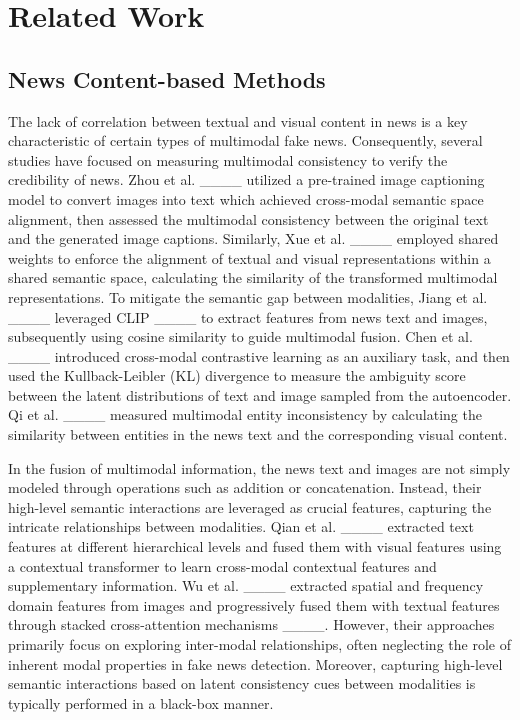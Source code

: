 \section{Related Work}

\subsection{News Content-based Methods}
The lack of correlation between textual and visual content in news is a key characteristic of certain types of multimodal fake news. Consequently, several studies have focused on measuring multimodal consistency to verify the credibility of news. Zhou et al. ____ utilized a pre-trained image captioning model to convert images into text which achieved cross-modal semantic space alignment, then assessed the multimodal consistency between the original text and the generated image captions. Similarly, Xue et al. ____ employed shared weights to enforce the alignment of textual and visual representations within a shared semantic space, calculating the similarity of the transformed multimodal representations. To mitigate the semantic gap between modalities, Jiang et al. ____ leveraged CLIP ____ to extract features from news text and images, subsequently using cosine similarity to guide multimodal fusion. Chen et al. ____ introduced cross-modal contrastive learning as an auxiliary task, and then used the Kullback-Leibler (KL) divergence to measure the ambiguity score between the latent distributions of text and image sampled from the autoencoder. Qi et al. ____ measured multimodal entity inconsistency by calculating the similarity between entities in the news text and the corresponding visual content. 

In the fusion of multimodal information, the news text and images are not simply modeled through operations such as addition or concatenation. Instead, their high-level semantic interactions are leveraged as crucial features, capturing the intricate relationships between modalities. Qian et al. ____ extracted text features at different hierarchical levels and fused them with visual features using a contextual transformer to learn cross-modal contextual features and supplementary information. Wu et al. ____ extracted spatial and frequency domain features from images and progressively fused them with textual features through stacked cross-attention mechanisms ____.
However, their approaches primarily focus on exploring inter-modal relationships, often neglecting the role of inherent modal properties in fake news detection. Moreover, capturing high-level semantic interactions based on latent consistency cues between modalities is typically performed in a black-box manner.

